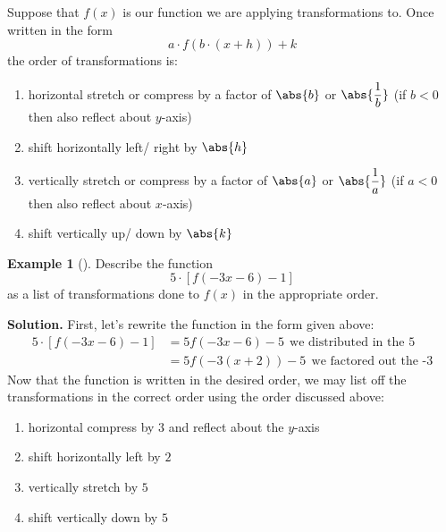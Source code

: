 \documentclass[10pt,]{book}
\theoremstyle{plain}
\theoremstyle{definition}
\theoremstyle{definition}
\theoremstyle{definition}
\newtheorem{example}[theorem]{Example}
\theoremstyle{definition}
\numberwithin{equation}{section}
\newcommand{\lt}{<}
\newcommand{\amp}{&}
\begin{document}
\begin{assemblage}\label{assemblage-14}
\hypertarget{p-102}{}%
Suppose that \(f(x)\) is our function we are applying transformations to. Once written in the form%
\begin{equation*}
a\cdot f(b\cdot (x+h))+k
\end{equation*}
the order of transformations is:%
\par
\hypertarget{p-103}{}%
\leavevmode%
\begin{enumerate}
\item\hypertarget{li-28}{}horizontal stretch or compress by a factor of \(\abs{b}\) or \(\abs{\dfrac{1}{b}}\) (if \(b\lt 0\) then also reflect about \(y\)-axis)%
\item\hypertarget{li-29}{}shift horizontally left/ right by \(\abs{h} \)%
\item\hypertarget{li-30}{}vertically stretch or compress by a factor of \(\abs{a}\) or \(\abs{\dfrac{1}{a}}\) (if \(a\lt 0\) then also reflect about \(x\)-axis)%
\item\hypertarget{li-31}{}shift vertically up/ down by \(\abs{k} \)%
\end{enumerate}
%
\end{assemblage}
\begin{example}[]\label{example-13}
\hypertarget{p-104}{}%
Describe the function%
\begin{equation*}
5\cdot [f(-3x-6)-1]
\end{equation*}
as a list of transformations done to \(f(x)\) in the appropriate order.%
\par\smallskip%
\noindent\textbf{Solution.}\hypertarget{solution-7}{}\quad%
\hypertarget{p-105}{}%
First, let's rewrite the function in the form given above: \begin{align*} 5\cdot [f(-3x-6)-1]\amp = 5f(-3x-6)-5 \ \ \text{we distributed in the 5}\\ \amp = 5f(-3(x+2))-5 \ \ \text{we factored out the -3} \end{align*} Now that the function is written in the desired order, we may list off the transformations in the correct order using the order discussed above: \leavevmode%
\begin{enumerate}
\item\hypertarget{li-32}{}horizontal compress by \(3\) and reflect about the \(y\)-axis%
\item\hypertarget{li-33}{}shift horizontally left by \(2 \)%
\item\hypertarget{li-34}{}vertically stretch by \(5\)%
\item\hypertarget{li-35}{}shift vertically down by \(5 \)%
\end{enumerate}
%
\end{example}
\typeout{************************************************}
\typeout{************************************************}
\end{document}
